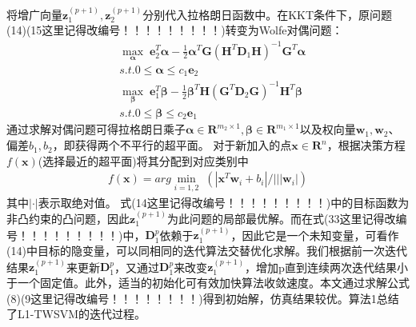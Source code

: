 \documentclass{article}
\theoremstyle{definition}
\theoremstyle{definition}
\theoremstyle{remark}
\begin{document}
将增广向量$\mathbf{z}_1^{(p+1)},\mathbf{z}_2^{(p+1)}$分别代入拉格朗日函数中。在KKT条件下，原问题(14)(15这里记得改编号！！！！！！！！！)转变为Wolfe对偶问题：
\begin{align}
&\max \limits_{\pmb{\alpha}} \; \mathbf{e}_2^T\pmb{\alpha}-\frac{1}{2}\pmb{\alpha}^T\mathbf{G}(\mathbf{H}^T\mathbf{D}_1\mathbf{H})^{-1}\mathbf{G}^T\pmb{\alpha}\nonumber\\
&s.t. 0\le \pmb{\alpha} \le c_1\mathbf{e}_2\\
&\max \limits_{\pmb{\beta}} \; \mathbf{e}_1^T\pmb{\beta}-\frac{1}{2}\pmb{\beta}^T\mathbf{H}(\mathbf{G}^T\mathbf{D}_2\mathbf{G})^{-1}\mathbf{H}^T\pmb{\beta}\nonumber\\
&s.t. 0\le \pmb{\beta} \le c_2\mathbf{e}_1
\end{align}
通过求解对偶问题可得拉格朗日乘子$\pmb{\alpha} \in \pmb{R}^{m_2\times 1},\pmb{\beta} \in \pmb{R}^{m_1\times 1}$以及权向量$\mathbf{w}_1,\mathbf{w}_2$、偏差$b_1,b_2$，即获得两个不平行的超平面。
对于新加入的点$\mathbf{x}\in \mathbf{R}^n$，根据决策方程$f(\mathbf{x})$(选择最近的超平面)将其分配到对应类别中
\begin{align}
f(\mathbf{x})=arg \min\limits_{i=1,2} \;(|\mathbf{x}^T\mathbf{w}_i+b_i|/|||\mathbf{w}_i|)
\end{align}
其中$|\cdot|$表示取绝对值。
式(14这里记得改编号！！！！！！！！！)中的目标函数为非凸约束的凸问题，因此$\mathbf{z}_1^{(p+1)}$为此问题的局部最优解。而在式(33这里记得改编号！！！！！！！！！)中，$\mathbf{D}_1^p$依赖于$\mathbf{z}_1^{(p+1)}$，因此它是一个未知变量，可看作(14)中目标的隐变量，可以同相同的迭代算法交替优化求解。我们根据前一次迭代结果$\mathbf{z}_1^{(p+1)}$来更新$\mathbf{D}_1^p$，又通过$\mathbf{D}_1^p$来改变$\mathbf{z}_1^{(p+1)}$，增加p直到连续两次迭代结果小于一个固定值。此外，适当的初始化可有效加快算法收敛速度。本文通过求解公式(8)(9这里记得改编号！！！！！！！！)得到初始解，仿真结果较优。算法1总结了L1-TWSVM的迭代过程。
\end{document}
